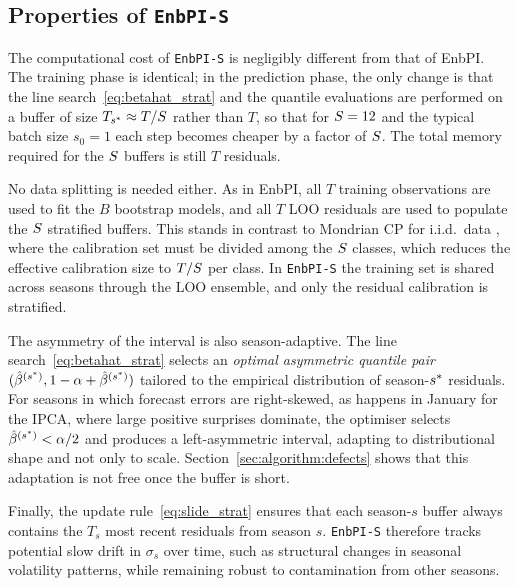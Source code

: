 \subsection{Properties of \texttt{EnbPI-S}}
\label{sec:algorithm:properties}

The computational cost of \texttt{EnbPI-S} is negligibly different
from that of EnbPI.  The training phase is identical; in the
prediction phase, the only change is that the line
search~\eqref{eq:betahat_strat} and the quantile evaluations are
performed on a buffer of size $T_{s^*} \approx T/S$ rather
than $T$, so that for $S = 12$ and the typical batch size
$s_0 = 1$ each step becomes cheaper by a factor of $S$.  The
total memory required for the $S$ buffers is still $T$ residuals.

No data splitting is needed either.  As in EnbPI, all $T$ training
observations are used to fit the $B$ bootstrap models, and all $T$
LOO residuals are used to populate the $S$ stratified buffers.
This stands in contrast to Mondrian CP for i.i.d.\ data
\citep{vovk2005mondrian,dewolf2025conditional}, where the calibration
set must be divided among the $S$ classes, which reduces the
effective calibration size to $T/S$ per class.  In
\texttt{EnbPI-S} the training set is shared across seasons through
the LOO ensemble, and only the residual calibration is stratified.

The asymmetry of the interval is also season-adaptive.  The line
search~\eqref{eq:betahat_strat} selects an \emph{optimal asymmetric
quantile pair} $(\hat{\beta}^{(s^*)},
1-\alpha+\hat{\beta}^{(s^*)})$ tailored to the empirical
distribution of season-$s^*$ residuals.  For seasons in which
forecast errors are right-skewed, as happens in January for the IPCA,
where large positive surprises dominate, the optimiser selects
$\hat{\beta}^{(s^*)} < \alpha/2$ and produces a left-asymmetric
interval, adapting to distributional shape and not only to scale.
Section~\ref{sec:algorithm:defects} shows that this adaptation is not
free once the buffer is short.

Finally, the update rule~\eqref{eq:slide_strat} ensures that each
season-$s$ buffer always contains the $T_s$ most recent residuals
from season $s$.  \texttt{EnbPI-S} therefore tracks potential slow drift in
$\sigma_s$ over time, such as structural changes in seasonal
volatility patterns, while remaining robust to contamination from
other seasons.

